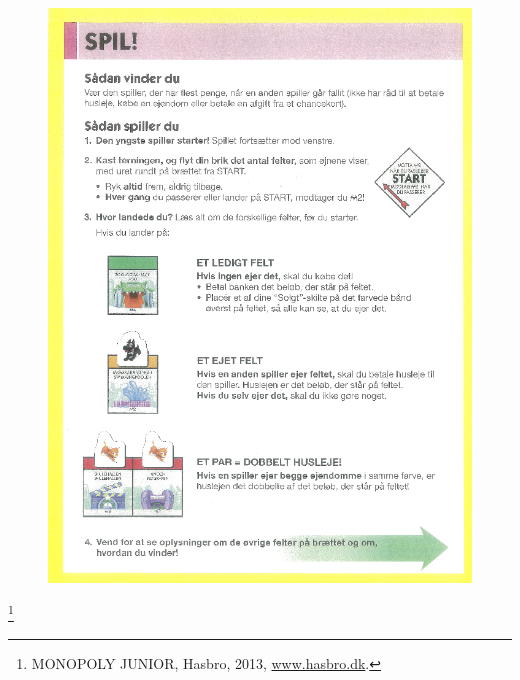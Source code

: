 \begin{figure}[H]
    \begin{center}
        \includegraphics[width=13cm]{graphics/rules/Rules2.png}
    \end{center}
\end{figure}
\footnote{MONOPOLY JUNIOR, Hasbro, 2013, \href{https://www.hasbro.dk}{www.hasbro.dk}.}
\pagebreak


